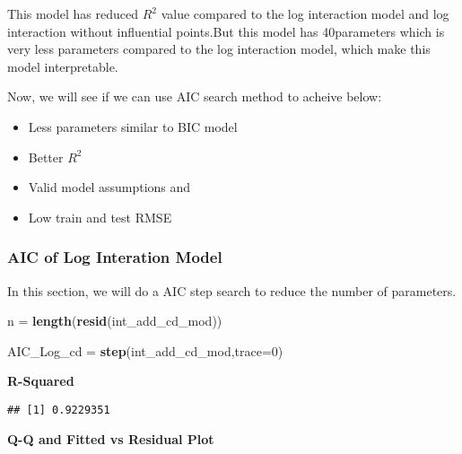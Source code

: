 \documentclass[]{article}
\newenvironment{Shaded}{\begin{snugshade}}{\end{snugshade}}
\newcommand{\KeywordTok}[1]{\textcolor[rgb]{0.13,0.29,0.53}{\textbf{#1}}}
\newcommand{\DataTypeTok}[1]{\textcolor[rgb]{0.13,0.29,0.53}{#1}}
\newcommand{\DecValTok}[1]{\textcolor[rgb]{0.00,0.00,0.81}{#1}}
\newcommand{\StringTok}[1]{\textcolor[rgb]{0.31,0.60,0.02}{#1}}
\newcommand{\OperatorTok}[1]{\textcolor[rgb]{0.81,0.36,0.00}{\textbf{#1}}}
\newcommand{\NormalTok}[1]{#1}
\providecommand{\tightlist}{%
  \setlength{\itemsep}{0pt}\setlength{\parskip}{0pt}}
\begin{document}
This model has reduced \(R^2\) value compared to the log interaction
model and log interaction without influential points.But this model has
40parameters which is very less parameters compared to the log
interaction model, which make this model interpretable.

Now, we will see if we can use AIC search method to acheive below:

\begin{itemize}
\tightlist
\item
  Less parameters similar to BIC model
\item
  Better \(R^2\)
\item
  Valid model assumptions and
\item
  Low train and test RMSE
\end{itemize}

\subsubsection{AIC of Log Interation
Model}\label{aic-of-log-interation-model}

In this section, we will do a AIC step search to reduce the number of
parameters.

\begin{Shaded}
\begin{Highlighting}[]
\NormalTok{n =}\StringTok{ }\KeywordTok{length}\NormalTok{(}\KeywordTok{resid}\NormalTok{(int_add_cd_mod))}

\NormalTok{AIC_Log_cd =}\StringTok{ }\KeywordTok{step}\NormalTok{(int_add_cd_mod,}\DataTypeTok{trace=}\DecValTok{0}\NormalTok{)}
\end{Highlighting}
\end{Shaded}

\textbf{R-Squared}

\begin{Shaded}
\end{Shaded}

\begin{verbatim}
## [1] 0.9229351
\end{verbatim}

\textbf{Q-Q and Fitted vs Residual Plot}
\end{document}
